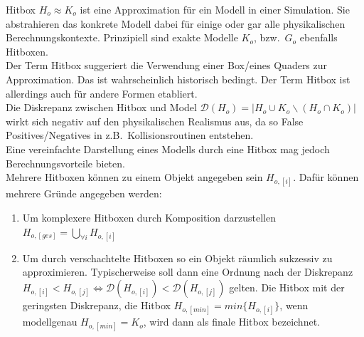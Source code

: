 \label{sec:hitbox}
Hitbox $H_o \approx K_o$ ist eine Approximation für ein Modell in einer Simulation. Sie abstrahieren das konkrete Modell dabei für einige oder gar alle physikalischen Berechnungskontexte. Prinzipiell sind exakte Modelle $K_o$, bzw.~$G_o$ ebenfalls Hitboxen.\\
Der Term Hitbox suggeriert die Verwendung einer Box/eines Quaders zur Approximation. Das ist wahrscheinlich historisch bedingt. Der Term Hitbox ist allerdings auch für andere Formen etabliert.\\
Die Diskrepanz zwischen Hitbox und Model $\mathcal{D}(H_o) = | H_o \cup K_o \backslash (H_o \cap K_o) |$ wirkt sich negativ auf den physikalischen Realismus aus, da so False Positives/Negatives  in z.B.~Kollisionsroutinen entstehen.\\
Eine vereinfachte Darstellung eines Modells durch eine Hitbox mag jedoch Berechnungsvorteile bieten.\\
Mehrere Hitboxen können zu einem Objekt angegeben sein $H_{o, [i]}$. Dafür können mehrere Gründe angegeben werden:
\begin{enumerate}
\item Um komplexere Hitboxen durch Komposition darzustellen $H_{o, [ges]} = \bigcup_{\forall i}H_{o, [i]}$
\item Um durch verschachtelte Hitboxen so ein Objekt räumlich sukzessiv zu approximieren.
Typischerweise soll dann eine Ordnung nach der Diskrepanz $H_{o, [i]} < H_{o, [j]} \Leftrightarrow \mathcal{D}(H_{o, [i]}) < \mathcal{D}(H_{o, [j]})$ gelten. Die Hitbox mit der geringsten Diskrepanz, die Hitbox $H_{o, [min]}=min\{H_{o, [i]}\}$, wenn modellgenau $H_{o, [min]} = K_o$, wird dann als finale Hitbox bezeichnet.
\end{enumerate}

